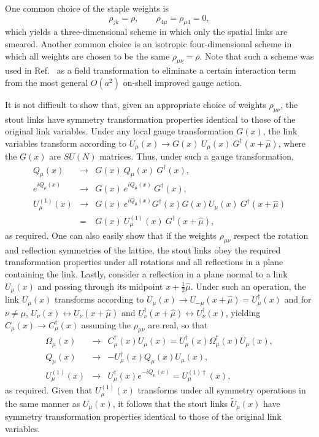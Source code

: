 One common choice of the staple weights is
\begin{equation}
   \rho_{jk}=\rho,\qquad \rho_{4\mu}=\rho_{\mu 4}=0,
\end{equation}
which yields a three-dimensional scheme in which only the spatial
links are smeared.  Another common choice is an isotropic four-dimensional
scheme in which all weights are chosen to be the same
$\rho_{\mu\nu}=\rho$.  Note that such a scheme 
was used in Ref.~\cite{luscher} as a field transformation
to eliminate a certain interaction term from the most general $O(a^2)$
on-shell improved gauge action.

It is not difficult to show that, given an appropriate choice of weights
$\rho_{\mu\nu}$, the stout links have symmetry transformation
properties identical to those of the original link variables.
Under any local gauge transformation $G(x)$,
the link variables transform according to 
$U_\mu(x)\rightarrow G(x)\ U_\mu(x)\ G^\dagger(x\!+\!\hat{\mu})$,
where the $G(x)$ are $SU(N)$ matrices.  Thus,
under such a gauge transformation,
\begin{eqnarray}
Q_\mu(x)&\rightarrow& G(x)\ Q_\mu(x)\ G^\dagger(x),\\
e^{iQ_\mu(x)}&\rightarrow& G(x)\ e^{iQ_\mu(x)}\ G^\dagger(x),\\
U^{(1)}_\mu(x)&\rightarrow& G(x)\ e^{iQ_\mu(x)} G^\dagger(x)
 G(x)U_\mu(x)\ G^\dagger(x\!+\!\hat{\mu})\nonumber\\
 &=& G(x)\ U^{(1)}_\mu(x)\ G^\dagger(x\!+\!\hat{\mu}),
\end{eqnarray}
as required.  One can also easily show that if the weights $\rho_{\mu\nu}$
respect the rotation and reflection symmetries of the lattice,
the stout links obey the
required transformation properties under all rotations and all
reflections in a plane containing the link.  Lastly, consider a
reflection in a plane normal to a link $U_\mu(x)$ and passing through its
midpoint $x\!+\!\frac{1}{2}\hat{\mu}$. Under such an operation, the
link $U_\mu(x)$ transforms according to 
$U_\mu(x)\rightarrow U_{-\mu}(x\!+\!\hat{\mu})=U_\mu^\dagger(x)$ and
for $\nu\neq \mu$, $U_\nu(x)\leftrightarrow U_\nu(x\!+\!\hat{\mu})$ and
$U_\nu^\dagger(x\!+\!\hat{\mu})\leftrightarrow U_\nu^\dagger(x)$, yielding
$C_\mu(x)\rightarrow C_\mu^\dagger(x)$ assuming the $\rho_{\mu\nu}$
are real, so that
\begin{eqnarray}
 \Omega_\mu(x) &\rightarrow & C_\mu^\dagger(x)U_\mu(x)=U_\mu^\dagger(x)
 \Omega_\mu^\dagger(x) U_\mu(x),\\
 Q_\mu(x)&\rightarrow & -U_\mu^\dagger(x)Q_\mu(x)U_\mu(x),\\
 U^{(1)}_\mu(x)&\rightarrow & U_\mu^\dagger(x) e^{-iQ_\mu(x)}
   = U_\mu^{(1)\dagger}(x),
\end{eqnarray}
as required.  Given that $U^{(1)}_\mu(x)$ transforms under all symmetry
operations in the same manner as $U_\mu(x)$, it follows that the stout
links $\tilde{U}_\mu(x)$ have symmetry transformation properties identical
to those of the original link variables.

